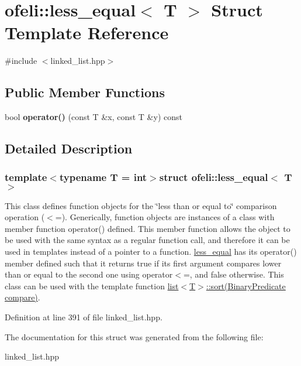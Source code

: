 \hypertarget{structofeli_1_1less__equal}{\section{ofeli\-:\-:less\-\_\-equal$<$ T $>$ Struct Template Reference}
\label{structofeli_1_1less__equal}
}


{\ttfamily \#include $<$linked\-\_\-list.\-hpp$>$}

\subsection*{Public Member Functions}
\begin{DoxyCompactItemize}
\item 
\hypertarget{structofeli_1_1less__equal_a8691d82bcc8b0cb6aa5e06ebc47d1a1d}{bool {\bfseries operator()} (const T \&x, const T \&y) const }\label{structofeli_1_1less__equal_a8691d82bcc8b0cb6aa5e06ebc47d1a1d}

\end{DoxyCompactItemize}


\subsection{Detailed Description}
\subsubsection*{template$<$typename T = int$>$struct ofeli\-::less\-\_\-equal$<$ T $>$}

This class defines function objects for the \char`\"{}less than or equal to\char`\"{} comparison operation ($<$=). Generically, function objects are instances of a class with member function {\ttfamily operator()} defined. This member function allows the object to be used with the same syntax as a regular function call, and therefore it can be used in templates instead of a pointer to a function. {\ttfamily \hyperlink{structofeli_1_1less__equal}{less\-\_\-equal}} has its {\ttfamily operator()} member defined such that it returns {\ttfamily true} if its first argument compares lower than or equal to the second one using {\ttfamily operator$<$=}, and {\ttfamily false} otherwise. This class can be used with the template function {\ttfamily \hyperlink{classofeli_1_1list_aaeedac18b70d233644d84c7ad3a9a3fa}{list$<$\-T$>$\-::sort(\-Binary\-Predicate compare)}}. 

Definition at line 391 of file linked\-\_\-list.\-hpp.



The documentation for this struct was generated from the following file\-:\begin{DoxyCompactItemize}
\item 
linked\-\_\-list.\-hpp\end{DoxyCompactItemize}

